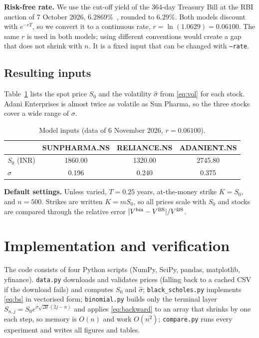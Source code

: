 \documentclass[10pt,a4paper]{article}
\begin{document}
\textbf{Risk-free rate.} We use the cut-off yield of the 364-day Treasury Bill at the RBI auction of
7 October 2026, $6.2869\%$~\cite{rbitbill}, rounded to $6.29\%$. Both models discount with $e^{-rT}$, so
we convert it to a continuous rate, $r=\ln(1.0629)=0.06100$. The same $r$ is used in both models; using
different conventions would create a gap that does not shrink with $n$. It is a fixed input that can be
changed with \texttt{--rate}.

\subsection{Resulting inputs}
Table~\ref{tab:inputs} lists the spot price $S_0$ and the volatility $\hat\sigma$ from \eqref{eq:vol}
for each stock. Adani Enterprises is almost twice as volatile as Sun Pharma, so the three stocks
cover a wide range of $\sigma$.

\begin{table}[H]
\centering\small
\caption{Model inputs (data of 6 November 2026, $r=0.06100$).}\label{tab:inputs}
\begin{tabular}{lccc}\toprule
 & SUNPHARMA.NS & RELIANCE.NS & ADANIENT.NS\\\midrule
$S_0$ (INR) & 1860.00 & 1320.00 & 2745.80\\
$\hat\sigma$ & 0.196 & 0.240 & 0.375\\\bottomrule
\end{tabular}
\end{table}

\textbf{Default settings.} Unless varied, $T=0.25$ years, at-the-money strike $K=S_0$, and $n=500$.
Strikes are written $K=mS_0$, so all prices scale with $S_0$ and stocks are compared through the relative
error $|V^{\rm bin}-V^{\rm BS}|/V^{\rm BS}$.

\section{Implementation and verification}
The code consists of four Python scripts (NumPy, SciPy, pandas, matplotlib, yfinance).
\texttt{data.py} downloads and validates prices (falling back to a cached CSV if the download fails) and
computes $S_0$ and $\hat\sigma$; \texttt{black\_scholes.py} implements \eqref{eq:bs} in vectorised form;
\texttt{binomial.py} builds only the terminal layer $S_{n,j}=S_0e^{\sigma\sqrt{\Delta t}(2j-n)}$ and applies
\eqref{eq:backward} to an array that shrinks by one each step, so memory is $O(n)$ and work $O(n^2)$;
\texttt{compare.py} runs every experiment and writes all figures and tables.
\end{document}
